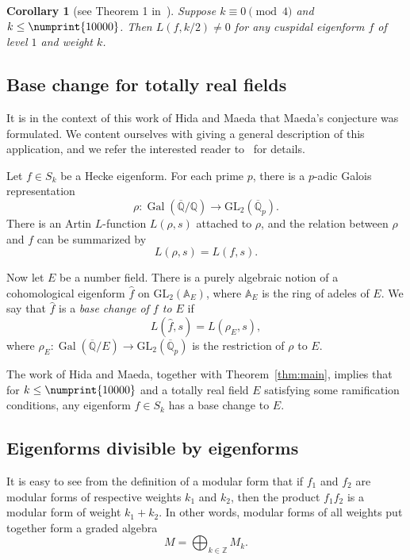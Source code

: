 \documentclass[11pt]{article}
\theoremstyle{plain}
\newtheorem{corollary}[theorem]{Corollary}
\theoremstyle{definition}
\theoremstyle{remark}
\numberwithin{equation}{section}
\newcommand{\longto}{\longrightarrow}
\newcommand{\ZZ}{\mathbb{Z}}
\newcommand{\QQ}{\mathbb{Q}}
\newcommand{\Gal}{\operatorname{Gal}}
\newcommand{\bound}{\numprint{10000}}
\newcommand{\GL}{\mathrm{GL}}
\begin{document}
\begin{corollary}[see Theorem 1 in~\cite{ConreyFarmer}]
  Suppose $k\equiv 0\pmod{4}$ and $k\leq\bound$.  Then
  $L(f, k/2)\neq 0$ for any cuspidal eigenform $f$ of level $1$ and weight $k$.
\end{corollary}

\subsection{Base change for totally real fields}
It is in the context of this work of Hida and Maeda that
Maeda's conjecture was formulated.  We content ourselves with giving a general
description of this application, and we refer the interested reader
to~\cite{HidaMaeda} for details. 

Let $f\in S_k$ be a Hecke eigenform.  For each prime $p$, there is a $p$-adic
Galois representation
\begin{equation*}
  \rho\colon\Gal\left(\overline{\QQ}/\QQ\right)
  \longto\GL_2\left(\overline{\QQ}_p\right).
\end{equation*}
There is an Artin $L$-function $L(\rho, s)$ attached to $\rho$, and the
relation between $\rho$ and $f$ can be summarized by
\begin{equation*}
  L(\rho, s) = L(f, s).
\end{equation*}

Now let $E$ be a number field.  There is a purely algebraic notion of a
cohomological eigenform $\hat{f}$ on $\GL_2(\mathbb{A}_E)$, where 
$\mathbb{A}_E$ is the ring
of adeles of $E$.  We say that $\hat{f}$ is a \emph{base change of $f$ to $E$}
if
\begin{equation*}
  L(\hat{f}, s) = L(\rho_E, s),
\end{equation*}
where $\rho_E\colon\Gal(\overline{\QQ}/E)\longto\GL_2(\overline{\QQ}_p)$ is
the restriction of $\rho$ to $E$.

The work of Hida and Maeda, together with Theorem~\ref{thm:main}, implies that
for $k\leq\bound$ and a totally real field $E$ satisfying some ramification
conditions, any eigenform $f\in S_k$ has a base change to $E$.

\subsection{Eigenforms divisible by eigenforms}
It is easy to see from the definition of a modular form that if $f_1$ and
$f_2$ are modular forms of respective weights $k_1$ and $k_2$, then the
product $f_1f_2$ is a modular form of weight $k_1+k_2$.  In other words,
modular forms of all weights put together form a graded algebra
\begin{equation*}
  M=\bigoplus_{k\in\ZZ} M_k.
\end{equation*}
\end{document}
